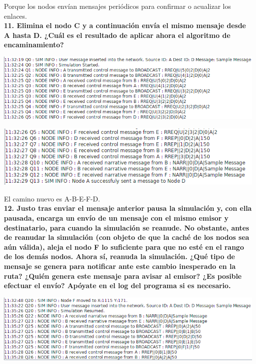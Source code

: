 \documentclass{article}
\begin{document}
Porque los nodos envían mensajes periódicos para confirmar o acualizar los enlaces.\\

\textbf{11. Elimina el nodo C y a continuación envía el mismo mensaje desde A hasta D. ¿Cuál es el resultado de aplicar ahora el algoritmo de encaminamiento?}

\begin{center}
\includegraphics[scale=0.5]{log3.png}
\end{center}

\begin{center}
\includegraphics[scale=0.5]{log4.png}
\end{center}

El camino nuevo es A-B-E-F-D.\\

\textbf{12. Justo tras enviar el mensaje anterior pausa la simulación y, con ella pausada, encarga un envío de un mensaje con el mismo emisor y destinatario, para cuando la
simulación se reanude. No obstante, antes de reanudar la simulación (con objeto de
que la caché de los nodos sea aún válida), aleja el nodo F lo suficiente para que no
esté en el rango de los demás nodos. Ahora sí, reanuda la simulación. ¿Qué tipo de mensaje se genera para notificar ante este cambio inesperado en la ruta? ¿Quién genera este mensaje para avisar al emisor? ¿Es posible efectuar el envío? Apóyate en el log del programa si es necesario.}

\begin{center}
\includegraphics[scale=0.5]{log5.png}
\end{center}
\end{document}
